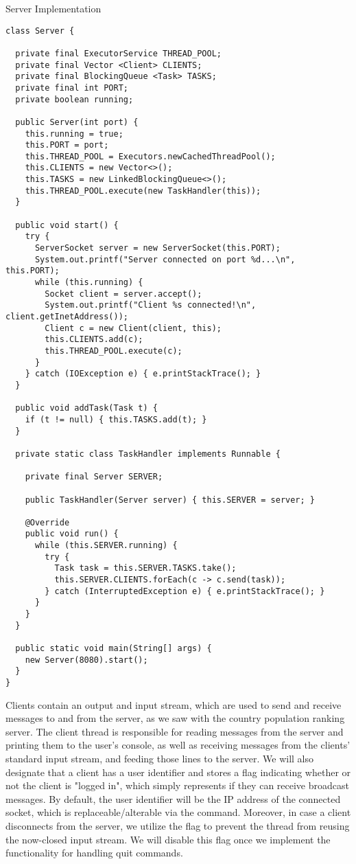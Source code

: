 \begin{cl}{Server Implementation}
\begin{lstlisting}[language=MyJava]
class Server {

  private final ExecutorService THREAD_POOL;
  private final Vector <Client> CLIENTS;
  private final BlockingQueue <Task> TASKS;
  private final int PORT;
  private boolean running;

  public Server(int port) {
    this.running = true;
    this.PORT = port;
    this.THREAD_POOL = Executors.newCachedThreadPool();
    this.CLIENTS = new Vector<>();
    this.TASKS = new LinkedBlockingQueue<>();
    this.THREAD_POOL.execute(new TaskHandler(this));
  }

  public void start() {
    try {
      ServerSocket server = new ServerSocket(this.PORT);
      System.out.printf("Server connected on port %d...\n", this.PORT);
      while (this.running) {
        Socket client = server.accept();
        System.out.printf("Client %s connected!\n", client.getInetAddress());
        Client c = new Client(client, this);
        this.CLIENTS.add(c);
        this.THREAD_POOL.execute(c);
      }
    } catch (IOException e) { e.printStackTrace(); }
  }

  public void addTask(Task t) {
    if (t != null) { this.TASKS.add(t); }
  }

  private static class TaskHandler implements Runnable {

    private final Server SERVER;

    public TaskHandler(Server server) { this.SERVER = server; }

    @Override
    public void run() {
      while (this.SERVER.running) {
        try {
          Task task = this.SERVER.TASKS.take();
          this.SERVER.CLIENTS.forEach(c -> c.send(task));
        } catch (InterruptedException e) { e.printStackTrace(); }
      }
    }
  }

  public static void main(String[] args) {
    new Server(8080).start();
  }
}
\end{lstlisting}
\end{cl}

Clients contain an output and input stream, which are used to send and receive messages to and from the server, as we saw with the country population ranking server. The client thread is responsible for reading messages from the server and printing them to the user's console, as well as receiving messages from the clients' standard input stream, and feeding those lines to the server. We will also designate that a client has a user identifier and stores a flag indicating whether or not the client is "logged in", which simply represents if they can receive broadcast messages. By default, the user identifier will be the IP address of the connected socket, which is replaceable/alterable via the  command. Moreover, in case a client disconnects from the server, we utilize the  flag to prevent the thread from reusing the now-closed input stream. We will disable this flag once we implement the functionality for handling quit commands.

